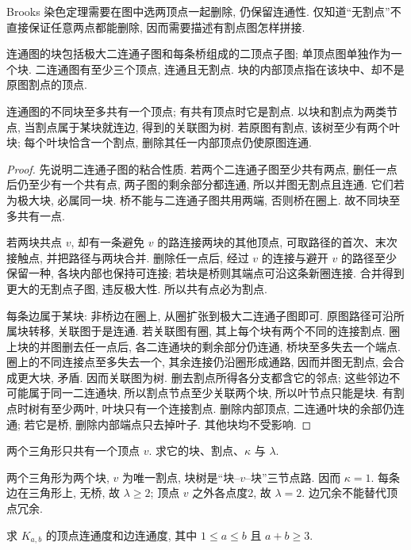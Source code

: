 Brooks 染色定理需要在图中选两顶点一起删除, 仍保留连通性. 仅知道“无割点”不直接保证任意两点都能删除, 因而需要描述有割点图怎样拼接.
\begin{definition}
连通图的块包括极大二连通子图和每条桥组成的二顶点子图; 单顶点图单独作为一个块. 二连通图有至少三个顶点, 连通且无割点. 块的内部顶点指在该块中、却不是原图割点的顶点.
\end{definition}
\begin{lemma}\label{lem:blocktree}
连通图的不同块至多共有一个顶点; 有共有顶点时它是割点. 以块和割点为两类节点, 当割点属于某块就连边, 得到的关联图为树. 若原图有割点, 该树至少有两个叶块; 每个叶块恰含一个割点, 删除其任一内部顶点仍使原图连通.
\end{lemma}
\begin{proof}
先说明二连通子图的粘合性质. 若两个二连通子图至少共有两点, 删任一点后仍至少有一个共有点, 两子图的剩余部分都连通, 所以并图无割点且连通. 它们若为极大块, 必属同一块. 桥不能与二连通子图共用两端, 否则桥在圈上. 故不同块至多共有一点.

若两块共点 $v$, 却有一条避免 $v$ 的路连接两块的其他顶点, 可取路径的首次、末次接触点, 并把路径与两块合并. 删除任一点后, 经过 $v$ 的连接与避开 $v$ 的路径至少保留一种, 各块内部也保持可连接; 若块是桥则其端点可沿这条新圈连接. 合并得到更大的无割点子图, 违反极大性. 所以共有点必为割点.

每条边属于某块: 非桥边在圈上, 从圈扩张到极大二连通子图即可. 原图路径可沿所属块转移, 关联图于是连通. 若关联图有圈, 其上每个块有两个不同的连接割点. 圈上块的并图删去任一点后, 各二连通块的剩余部分仍连通, 桥块至多失去一个端点. 圈上的不同连接点至多失去一个, 其余连接仍沿圈形成通路, 因而并图无割点, 会合成更大块, 矛盾. 因而关联图为树. 删去割点所得各分支都含它的邻点; 这些邻边不可能属于同一二连通块, 所以割点节点至少关联两个块, 所以叶节点只能是块. 有割点时树有至少两叶, 叶块只有一个连接割点. 删除内部顶点, 二连通叶块的余部仍连通; 若它是桥, 删除内部端点只去掉叶子. 其他块均不受影响.
\end{proof}
\begin{example}
两个三角形只共有一个顶点 $v$. 求它的块、割点、$\kappa$ 与 $\lambda$.
\end{example}
\begin{solution}
两个三角形为两个块, $v$ 为唯一割点, 块树是“块--$v$--块”三节点路. 因而 $\kappa=1$. 每条边在三角形上, 无桥, 故 $\lambda\ge2$; 顶点 $v$ 之外各点度2, 故 $\lambda=2$. 边冗余不能替代顶点冗余.
\end{solution}
\begin{exercise}\label{ex:conn1}
求 $K_{a,b}$ 的顶点连通度和边连通度, 其中 $1\le a\le b$ 且 $a+b\ge3$.
\end{exercise}
